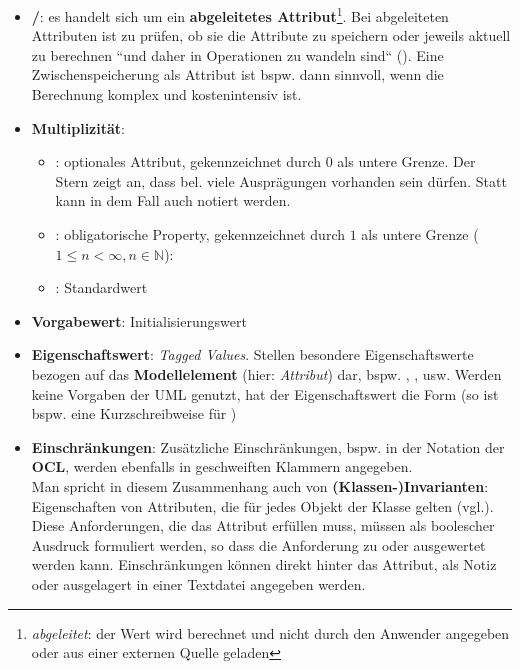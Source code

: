 \begin{itemize}
\begin{itemize}
        \item \textbf{/}: es handelt sich um ein \textbf{abgeleitetes Attribut}\footnote{
            \textit{abgeleitet}: der Wert wird berechnet und nicht durch den Anwender angegeben oder aus einer externen Quelle geladen
        }. Bei abgeleiteten Attributen ist zu prüfen, ob sie  die Attribute zu speichern oder jeweils aktuell zu berechnen ``und daher in Operationen zu wandeln sind`` (\cite[414]{Bal05}). Eine Zwischenspeicherung als Attribut ist bspw. dann sinnvoll, wenn die Berechnung komplex und kostenintensiv ist.
        \item \textbf{Multiplizität}:
        \begin{itemize}
            \item \code{[0..*]}: optionales Attribut, gekennzeichnet durch $0$ als untere Grenze.
            Der Stern \code{*} zeigt an, dass bel. viele Ausprägungen vorhanden sein dürfen.
            Statt \code{[0..*]} kann in dem Fall auch \code{[*]} notiert werden.
            \item \code{[1..n]}: obligatorische Property, gekennzeichnet durch $1$ als untere Grenze ($1 \leq n < \infty, n \in \mathbb{N}$):
            \item \code{[1]}: Standardwert
        \end{itemize}
        \item \textbf{Vorgabewert}: Initialisierungswert
        \item \textbf{Eigenschaftswert}: \textit{Tagged Values}.
        Stellen besondere Eigenschaftswerte bezogen auf das \textbf{Modellelement} (hier: \textit{Attribut}) dar, {bspw.} , ,  usw. Werden keine Vorgaben der UML genutzt, hat der Eigenschaftswert die Form  (so ist bspw.  eine Kurzschreibweise für  )
        \item \textbf{Einschränkungen}: Zusätzliche Einschränkungen, bspw. in der Notation der \textbf{OCL}, werden ebenfalls in geschweiften Klammern angegeben.\\
        Man spricht in diesem Zusammenhang auch von \textbf{(Klassen-)Invarianten}: Eigenschaften von Attributen, die für jedes Objekt der Klasse gelten (vgl.\cite[338]{Oes05}).
        Diese Anforderungen, die das Attribut erfüllen muss, müssen als boolescher Ausdruck formuliert werden, so dass die Anforderung zu  oder  ausgewertet werden kann.
        Einschränkungen können direkt hinter das Attribut, als Notiz oder ausgelagert in einer Textdatei angegeben werden.
    \end{itemize}

\end{itemize}

